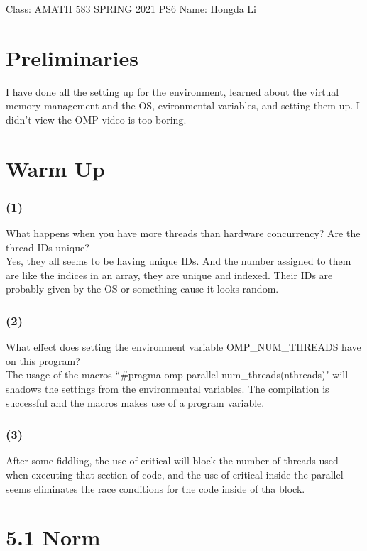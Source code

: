 \documentclass[]{article}
\begin{document}
\begin{center}
    Class: AMATH 583 SPRING 2021 PS6 \quad Name: Hongda Li
\end{center}
\section*{Preliminaries}
    I have done all the setting up for the environment, learned about the virtual memory management and the OS, evironmental variables, and setting them up. I didn't view the OMP video is too boring. 
\section*{Warm Up}
    \subsubsection*{(1)}
    What happens when you have more threads than hardware concurrency? Are the thread IDs unique?
    \\[1.1em]
    Yes, they all seems to be having unique IDs. And the number assigned to them are like the indices in an array, they are unique and indexed. Their IDs are probably given by the OS or something cause it looks random. 
    \subsubsection*{(2)}
    What effect does setting the environment variable OMP\_NUM\_THREADS have on this program?
    \\[1.1em]
    The usage of the macros ``\#pragma omp parallel num\_threads(nthreads)" will shadows the settings from the environmental variables. The compilation is successful and the macros makes use of a program variable. 
    \subsubsection*{(3)}
    After some fiddling, the use of critical will block the number of threads used when executing that section of code, and the use of critical inside the parallel seems eliminates the race conditions for the code inside of tha block. 

\section*{5.1 Norm}
\end{document}
